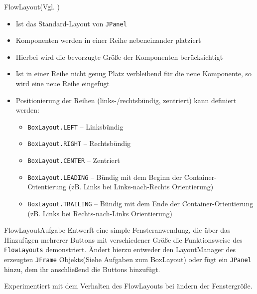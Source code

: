 \begin{frame}{FlowLayout}{(Vgl. \cite{orac:flowlayout})}
    \begin{itemize}
        \item Ist das Standard-Layout von \texttt{JPanel}
        \item Komponenten werden in einer Reihe nebeneinander platziert
        \item Hierbei wird die bevorzugte Größe der Komponenten berücksichtigt
        \item Ist in einer Reihe nicht genug Platz verbleibend für die neue Komponente, so wird eine neue Reihe eingefügt
        \item Positionierung der Reihen (links-/rechtsbündig, zentriert) kann definiert werden:
        \begin{itemize}
            \item \texttt{BoxLayout.LEFT} -- Linksbündig
            \item \texttt{BoxLayout.RIGHT} -- Rechtsbündig
            \item \texttt{BoxLayout.CENTER} -- Zentriert
            \item \texttt{BoxLayout.LEADING} -- Bündig mit dem Beginn der Container-Orientierung (zB. Links bei Links-nach-Rechts Orientierung)
            \item \texttt{BoxLayout.TRAILING} -- Bündig mit dem Ende der Container-Orientierung (zB. Links bei Rechts-nach-Links Orientierung)
        \end{itemize}
    \end{itemize}
\end{frame}

\begin{frame}{FlowLayout}{Aufgabe}
Entwerft eine simple Fensteranwendung, die über das Hinzufügen mehrerer Buttons mit verschiedener Größe die Funktionsweise des \texttt{FlowLayouts} demonstriert. Ändert hierzu
entweder den LayoutManager des erzeugten \texttt{JFrame} Objekts(Siehe Aufgaben zum BoxLayout) oder fügt ein \texttt{JPanel} hinzu, dem ihr anschließend die Buttons hinzufügt.

Experimentiert mit dem Verhalten des FlowLayouts bei ändern der Fenstergröße.
\end{frame}

